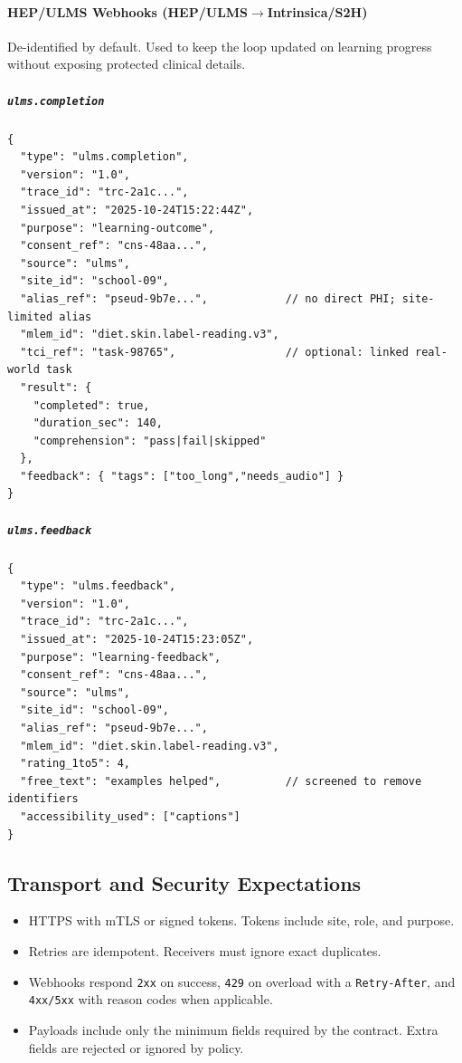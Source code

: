 \documentclass[12pt]{article}
\begin{document}
\paragraph{HEP/ULMS Webhooks (HEP/ULMS$\rightarrow$Intrinsica/S2H)}
De-identified by default. Used to keep the loop updated on learning progress without exposing protected clinical details.

\subparagraph{\texttt{ulms.completion}}
\begin{verbatim}
{
  "type": "ulms.completion",
  "version": "1.0",
  "trace_id": "trc-2a1c...",
  "issued_at": "2025-10-24T15:22:44Z",
  "purpose": "learning-outcome",
  "consent_ref": "cns-48aa...",
  "source": "ulms",
  "site_id": "school-09",
  "alias_ref": "pseud-9b7e...",            // no direct PHI; site-limited alias
  "mlem_id": "diet.skin.label-reading.v3",
  "tci_ref": "task-98765",                 // optional: linked real-world task
  "result": {
    "completed": true,
    "duration_sec": 140,
    "comprehension": "pass|fail|skipped"
  },
  "feedback": { "tags": ["too_long","needs_audio"] }
}
\end{verbatim}

\subparagraph{\texttt{ulms.feedback}}
\begin{verbatim}
{
  "type": "ulms.feedback",
  "version": "1.0",
  "trace_id": "trc-2a1c...",
  "issued_at": "2025-10-24T15:23:05Z",
  "purpose": "learning-feedback",
  "consent_ref": "cns-48aa...",
  "source": "ulms",
  "site_id": "school-09",
  "alias_ref": "pseud-9b7e...",
  "mlem_id": "diet.skin.label-reading.v3",
  "rating_1to5": 4,
  "free_text": "examples helped",          // screened to remove identifiers
  "accessibility_used": ["captions"]
}
\end{verbatim}

\subsection*{Transport and Security Expectations}
\begin{itemize}[leftmargin=*]
  \item HTTPS with mTLS or signed tokens. Tokens include site, role, and purpose.
  \item Retries are idempotent. Receivers must ignore exact duplicates.
  \item Webhooks respond \texttt{2xx} on success, \texttt{429} on overload with a \texttt{Retry-After}, and \texttt{4xx/5xx} with reason codes when applicable.
  \item Payloads include only the minimum fields required by the contract. Extra fields are rejected or ignored by policy.
\end{itemize}
\end{document}
